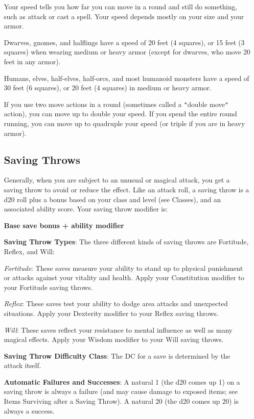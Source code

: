 				
Your speed tells you how far you can move in a round and still do something, such as attack or cast a spell. Your speed depends mostly on your size and your armor.
				
Dwarves, gnomes, and halflings have a speed of 20 feet (4 squares), or 15 feet (3 squares) when wearing medium or heavy armor (except for dwarves, who move 20 feet in any armor).
				
Humans, elves, half-elves, half-orcs, and most humanoid monsters have a speed of 30 feet (6 squares), or 20 feet (4 squares) in medium or heavy armor.
				
If you use two move actions in a round (sometimes called a \texttt{{}"{}}double move\texttt{{}"{}} action), you can move up to double your speed. If you spend the entire round running, you can move up to quadruple your speed (or triple if you are in heavy armor). 
				
\subsection{Saving Throws}

				
Generally, when you are subject to an unusual or magical attack, you get a saving throw to avoid or reduce the effect. Like an attack roll, a saving throw is a d20 roll plus a bonus based on your class and level (see Classes), and an associated ability score. Your saving throw modifier is:
				
{\large \textbf{Base save bonus + ability modifier}}
				
\textbf{Saving Throw Types}: The three different kinds of saving throws are Fortitude, Reflex, and Will:
				
\textit{Fortitude}: These saves measure your ability to stand up to physical punishment or attacks against your vitality and health. Apply your Constitution modifier to your Fortitude saving throws. 
				
\textit{Reflex}: These saves test your ability to dodge area attacks and unexpected situations. Apply your Dexterity modifier to your Reflex saving throws. 
				
\textit{Will}: These saves reflect your resistance to mental influence as well as many magical effects. Apply your Wisdom modifier to your Will saving throws.
				
\textbf{Saving Throw Difficulty Class}: The DC for a save is determined by the attack itself.
				
\textbf{Automatic Failures and Successes}: A natural 1 (the d20 comes up 1) on a saving throw is always a failure (and may cause damage to exposed items; see Items Surviving after a Saving Throw). A natural 20 (the d20 comes up 20) is always a success.


